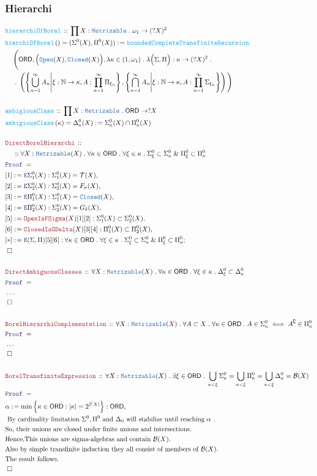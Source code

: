 \documentclass[12pt]{scrartcl}
\newcommand{\TYPE}[1]{\textcolor{NavyBlue}{\mathtt{#1}}}
\newcommand{\FUNC}[1]{\textcolor{Cerulean}{\mathtt{#1}}}
\newcommand{\LOGIC}[1]{\textcolor{Blue}{\mathtt{#1}}}
\newcommand{\THM}[1]{\textcolor{Maroon}{\mathtt{#1}}}
\renewcommand{\.}{\; . \;}
\newcommand{\de}{: \kern 0.1pc =}
\newcommand{\Act}[1]{\left( #1 \right)}
\newcommand{\Theorem}[2]{& \THM{#1} \, :: \, #2 \\ & \Proof = \\ }
\newcommand{\DeclareFunc}[2]{& \FUNC{#1} \, :: \, #2 \\}
\newcommand{\DefineNamedFunc}[4]{&  \FUNC{#1}\Act{#2} = #3 \de #4 \\}
\newcommand{\NewLine}{\\ & \kern 1pc}
\newcommand{\Page}[1]{ \begin{align*} #1 \end{align*}   }
\newcommand{\NoProof}{ & \ldots \\ \EndProof}
\renewcommand{\And}{\; \& \;}
\newcommand{\Elim}{\LOGIC{E}}
\newcommand{\Nat}{\mathbb{N} }
\renewcommand{\c}{\complement}
\newcommand{\Say}[3]{& #1 \de #2 : #3, \\}
\newcommand{\Conclude}[3]{& #1 \de #2 : #3; \\}
\newcommand{\QED}{\; \square}
\newcommand{\EndProof}{& \QED \\}
\newcommand{\Proof}{\LOGIC{Proof} \; }
\newcommand{\Explain}[1]{& \text{#1.} \\}
\newcommand{\B}{\mathcal{B}}
\newcommand{\ORD}{\mathsf{ORD}}
\newcommand{\Open}{\TYPE{Open}}
\newcommand{\Closed}{\TYPE{Closed}}
\newcommand{\T}{\mathcal{T}}
\begin{document}
\subsubsection{Hierarchi}
\Page{
	\DeclareFunc{hierarchiOfBorel}
	{
		\prod X : \TYPE{Metrizable} \. 
		\omega_1 \to (?X)^2
	}
	\DefineNamedFunc{hierchiOfBorel}{}{(\Sigma^0(X),\Pi^0(X))}
	{
		\FUNC{boundedCompleteTransfiniteRecursion} \NewLine
		\Bigg(
				\ORD,
				\Big( \Open(X),\Closed(X) \Big),
				\lambda \kappa \in (1, \omega_1) \.
				\lambda \Big(\Sigma,\Pi\Big):\kappa \to (?X)^2 \.
				\NewLine \.				
				\left( 
					\left\{ 
						\bigcup^\infty_{n=1} A_n    
						\Bigg| 
						\xi : \Nat \to \kappa, A : \prod^\infty_{n=1} \Pi_{\xi_n} 
					\right\},
					\left\{ 
						\bigcap^\infty_{n=1} A_n    
						\Bigg| 
						\xi : \Nat \to \kappa, A : \prod^\infty_{n=1} \Sigma_{\xi_n} 
					\right\}
				\right)  
		\Bigg)	
	}
	\\
	\DeclareFunc{ambigiousClass}
	{
		\prod X : \TYPE{Metrizable} \. 
		\ORD \to ?X
	}
	\DefineNamedFunc{ambigiousClass}{\kappa}{\Delta_\kappa^0(X)}
	{\Sigma_\kappa^0(X) \cap \Pi_\kappa^0(X)}
	\\
	\Theorem{DirectBorelHierarchi}
	{
		\NewLine ::		
		\forall X : \TYPE{Metrizable}(X) \.
		\forall \kappa \in \ORD \.
		\forall \xi \in \kappa \.
		\Sigma_{\xi}^0 \subset \Sigma_{\kappa}^0
		\And
		\Pi_{\xi}^0 \subset \Pi_{\kappa}^0
	}
	\Say{[1]}{\Elim \Sigma^0_1(X)}{\Sigma^0_1(X) = \T(X)}
	\Say{[2]}{\Elim \Sigma^0_2(X)}{\Sigma^0_2(X) = F_\sigma(X)}
	\Say{[3]}{\Elim \Pi^0_1(X)}{\Sigma^0_1(X) = \TYPE{Closed}(X)}
	\Say{[4]}{\Elim \Pi^0_2(X)}{\Sigma^0_2(X) = G_\delta(X)}
	\Say{[5]}{\THM{OpenIsFSigma}(X)[1][2]}{\Sigma^0_1(X) \subset \Sigma^0_2(X)}
	\Say{[6]}{\THM{ClosedIsGDelta}(X)[3][4]}{\Pi^0_1(X) \subset \Pi^0_2(X)}	
	\Conclude{[*]}{\Elim (\Sigma,\Pi)[5][6]}
	{
		\forall \kappa \in \ORD \.
		\forall \xi \in \kappa \.
		\Sigma_{\xi}^0 \subset \Sigma_{\kappa}^0
		\And
		\Pi_{\xi}^0 \subset \Pi_{\kappa}^0
	}
	\EndProof
	\\
	\Theorem{DirectAmbiguousClasses}
	{
		\forall X : \TYPE{Metrizable}(X) \.
		\forall \kappa \in \ORD \.
		\forall \xi \in \kappa \.
		\Delta_{\xi}^0 \subset \Delta_{\kappa}^0
	}
	\NoProof
	\\
	\Theorem{BorelHierarchiComplementation}
	{
		\forall X : \TYPE{Metrizable}(X) \.
		\forall A \subset X \.
		\forall \kappa \in \ORD \.
		A \in \Sigma^0_\kappa \iff A^\c \in \Pi^0_\kappa 
	}
	\NoProof
	\\
	\Theorem{BorelTransfiniteExpression}
	{
		\forall X : \TYPE{Metrizable}(X) \. 
		\exists \xi \in \ORD \.
		\bigcup_{\kappa < \xi} \Sigma^0_\kappa = 
		\bigcup_{\kappa < \xi} \Pi^0_\kappa = 
		\bigcup_{\kappa < \xi} \Delta^0_\kappa = 
		\B(X)
	}
	\Say{\alpha}{\min \Big\{ \kappa \in \ORD : |\kappa| = 2^{2^|X|} \Big\}}{\ORD}
	\Explain{
			By cardinality limitation $\Sigma^0,\Pi^0$ and $\Delta_0$ will stabilize 
			until reaching $\alpha$
		}
	\Explain{So, their unions are closed under finite unions and intersections}
	\Explain{Hence,This unions are sigma-algebras and contain $\B(X)$}
	\Explain{Also by simple transfinite induction they all consist of members of $\B(X)$}
	\Explain{The result follows}
	\EndProof
}
\newpage
\end{document}
